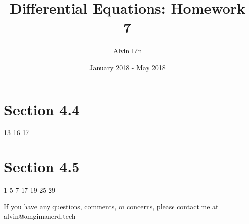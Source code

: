 \documentclass{math}
\title{Differential Equations: Homework 7}
\author{Alvin Lin}
\date{January 2018 - May 2018}
\begin{document}
\maketitle
\clearpage

\section*{Section 4.4}
13
16
17

\section*{Section 4.5}
1
5
7
17
19
25
29

\begin{center}
  If you have any questions, comments, or concerns, please contact me at
  alvin@omgimanerd.tech
\end{center}
\end{document}
